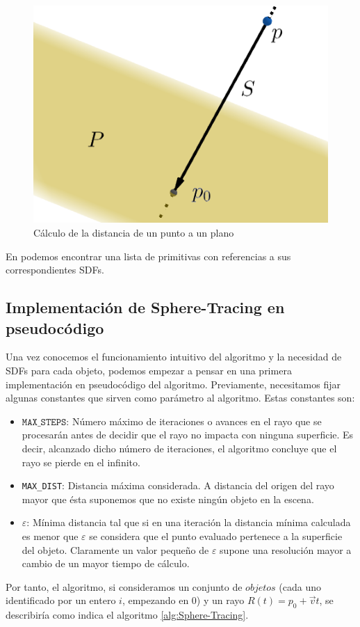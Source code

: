 \begin{figure} [ht]
    \centering
    \includegraphics[scale = 0.4]{img/C8/SDF-plano.png}
    \caption{Cálculo de la distancia de un punto a un plano}
    \label{fig:SDF-plano}
\end{figure}

En \cite[Table 1]{Hart-1995} podemos encontrar una lista de primitivas con referencias a sus correspondientes SDFs.

\subsection{Implementación de Sphere-Tracing en pseudocódigo}

Una vez conocemos el funcionamiento intuitivo del algoritmo y la necesidad de SDFs para cada objeto, podemos empezar a pensar en una primera implementación en pseudocódigo del algoritmo. Previamente, necesitamos fijar algunas constantes que sirven como parámetro al algoritmo. Estas constantes son:
\begin{itemize}
    \item $\mathtt{MAX\_STEPS}$: Número máximo de iteraciones o avances en el rayo que se procesarán antes de decidir que el rayo no impacta con ninguna superficie. Es decir, alcanzado dicho número de iteraciones, el algoritmo concluye que el rayo se pierde en el infinito.
    \item \texttt{MAX\_DIST}: Distancia máxima considerada. A distancia del origen del rayo mayor que ésta suponemos que no existe ningún objeto en la escena.
    \item $\varepsilon$: Mínima distancia tal que si en una iteración la distancia mínima calculada es menor que $\varepsilon$ se considera que el punto evaluado pertenece a la superficie del objeto. Claramente un valor pequeño de $\varepsilon$ supone una resolución mayor a cambio de un mayor tiempo de cálculo.
\end{itemize}
Por tanto, el algoritmo, si consideramos un conjunto de $objetos$ (cada uno identificado por un entero $i$, empezando en $0$) y un rayo $R(t)=p_0 + \vec v t$, se describiría como indica el algoritmo \ref{alg:Sphere-Tracing}.

